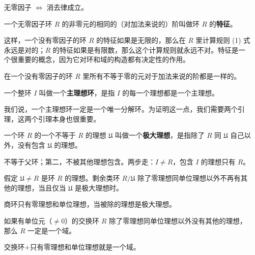 \begin{note}[零因子与消去律互相证明]
无零因子 $\Leftrightarrow$ 消去律成立。
\end{note}

\begin{definition}
一个无零因子环 $R$ 的非零元的相同的（对加法来说的）阶叫做环 $R$ 的\textbf{特征}。

这样，一个没有零因子的环 $R$ 的特征如果是无限的，那么在 $R$ 里计算规则 (1) 式永远是对的；$R$ 的特征如果是有限数，那么这个计算规则就永远不对。特征是一个很重要的概念，因为它对环和域的构造都有决定性的作用。
\end{definition}

\begin{theorem}
在一个没有零因子的环 $R$ 里所有不等于零的元对于加法来说的阶都是一样的。
\end{theorem}

\begin{definition}[主理想环的定义]
一个整环 $I$ 叫做一个\textbf{主理想环}，是指 $I$ 的每一个理想都是一个主理想。

我们说，一个主理想环一定是一个唯一分解环。为证明这一点，我们需要两个引理，这两个引理本身也很重要。
\end{definition}

\begin{definition}[极大理想的定义]
一个环 $R$ 的一个不等于 $R$ 的理想 $\mathfrak{U}$ 叫做一个\textbf{极大理想}，是指除了 $R$ 同 $\mathfrak{U}$ 自己以外，没有包含 $\mathfrak{U}$ 的理想。

不等于父环；第二，不被其他理想包含。两步走：$I\ne R$，包含 $I$ 的理想只有 $R$。
\end{definition}

\begin{lemma}[引理 1：极大理想对剩余类环充要]
假定 $\mathfrak{U}\ne R$ 是环 $R$ 的理想。剩余类环 $R/\mathfrak{U}$ 除了零理想同单位理想以外不再有其他的理想，当且仅当 $\mathfrak{U}$ 是极大理想时。

商环只有零理想和单位理想，当被除的理想是极大理想。
\end{lemma}

\begin{lemma}
如果有单位元（$\ne 0$）的交换环 $R$ 除了零理想同单位理想以外没有其他的理想，那么 $R$ 一定是一个域。

交换环+只有零理想和单位理想就是一个域。
\end{lemma}

